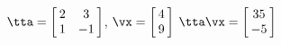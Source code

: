 {$\tta = \left[\hskip -3pt \begin{array}{cc} 2&3\\  1&-1\end {array} \hskip -3pt
 \right]$,\quad 
$\vx = \left[\hskip -3pt \begin{array}{c} 4\\  9\end{array}\hskip -3pt \right] $}
{$\tta\vx= \left[\hskip -3pt \begin{array}{c} 35\\  -5\end {array} \hskip -3pt
 \right]$
}
 
  

  

  


  

  

 

